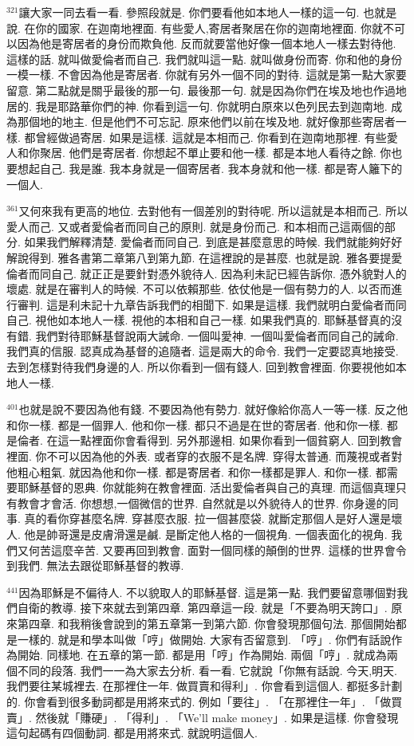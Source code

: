 \documentclass{book}
\begin{document}
$^{321}$讓大家一同去看一看.
參照段就是.
你們要看他如本地人一樣的這一句.
也就是說.
在你的國家.
在迦南地裡面.
有些愛人,寄居者聚居在你的迦南地裡面.
你就不可以因為他是寄居者的身份而欺負他.
反而就要當他好像一個本地人一樣去對待他.
這樣的話.
就叫做愛倫者而自己.
我們就叫這一點.
就叫做身份而寄.
你和他的身份一模一樣.
不會因為他是寄居者.
你就有另外一個不同的對待.
這就是第一點大家要留意.
第二點就是關乎最後的那一句.
最後那一句.
就是因為你們在埃及地也作過地居的.
我是耶路華你們的神.
你看到這一句.
你就明白原來以色列民去到迦南地.
成為那個地的地主.
但是他們不可忘記.
原來他們以前在埃及地.
就好像那些寄居者一樣.
都曾經做過寄居.
如果是這樣.
這就是本相而己.
你看到在迦南地那裡.
有些愛人和你聚居.
他們是寄居者.
你想起不單止要和他一樣.
都是本地人看待之餘.
你也要想起自己.
我是誰.
我本身就是一個寄居者.
我本身就和他一樣.
都是寄人籬下的一個人.

$^{361}$又何來我有更高的地位.
去對他有一個差別的對待呢.
所以這就是本相而己.
所以愛人而己.
又或者愛倫者而同自己的原則.
就是身份而己.
和本相而己這兩個的部分.
如果我們解釋清楚.
愛倫者而同自己.
到底是甚麼意思的時候.
我們就能夠好好解說得到.
雅各書第二章第八到第九節.
在這裡說的是甚麼.
也就是說.
雅各要提愛倫者而同自己.
就正正是要針對憑外貌待人.
因為利未記已經告訴你.
憑外貌對人的壞處.
就是在審判人的時候.
不可以依賴那些.
依仗他是一個有勢力的人.
以否而進行審判.
這是利未記十九章告訴我們的相聞下.
如果是這樣.
我們就明白愛倫者而同自己.
視他如本地人一樣.
視他的本相和自己一樣.
如果我們真的.
耶穌基督真的沒有錯.
我們對待耶穌基督說兩大誡命.
一個叫愛神.
一個叫愛倫者而同自己的誡命.
我們真的信服.
認真成為基督的追隨者.
這是兩大的命令.
我們一定要認真地接受.
去到怎樣對待我們身邊的人.
所以你看到一個有錢人.
回到教會裡面.
你要視他如本地人一樣.

$^{401}$也就是說不要因為他有錢.
不要因為他有勢力.
就好像給你高人一等一樣.
反之他和你一樣.
都是一個罪人.
他和你一樣.
都只不過是在世的寄居者.
他和你一樣.
都是倫者.
在這一點裡面你會看得到.
另外那邊相.
如果你看到一個貧窮人.
回到教會裡面.
你不可以因為他的外表.
或者穿的衣服不是名牌.
穿得太普通.
而蔑視或者對他粗心粗氣.
就因為他和你一樣.
都是寄居者.
和你一樣都是罪人.
和你一樣.
都需要耶穌基督的恩典.
你就能夠在教會裡面.
活出愛倫者與自己的真理.
而這個真理只有教會才會活.
你想想,一個微信的世界.
自然就是以外貌待人的世界.
你身邊的同事.
真的看你穿甚麼名牌.
穿甚麼衣服.
拉一個甚麼袋.
就斷定那個人是好人還是壞人.
他是帥哥還是皮膚滑還是鹹.
是斷定他人格的一個視角.
一個表面化的視角.
我們又何苦這麼辛苦.
又要再回到教會.
面對一個同樣的顛倒的世界.
這樣的世界會令到我們.
無法去跟從耶穌基督的教導.

$^{441}$因為耶穌是不偏待人.
不以貌取人的耶穌基督.
這是第一點.
我們要留意哪個對我們自衛的教導.
接下來就去到第四章.
第四章這一段.
就是「不要為明天誇口」.
原來第四章.
和我稍後會說到的第五章第一到第六節.
你會發現那個句法.
那個開始都是一樣的.
就是和學本叫做「哼」做開始.
大家有否留意到.
「哼」.
你們有話說作為開始.
同樣地.
在五章的第一節.
都是用「哼」作為開始.
兩個「哼」.
就成為兩個不同的段落.
我們一一為大家去分析.
看一看.
它就說「你無有話說.
今天,明天.
我們要往某城裡去.
在那裡住一年.
做買賣和得利」.
你會看到這個人.
都挺多計劃的.
你會看到很多動詞都是用將來式的.
例如「要往」.
「在那裡住一年」.
「做買賣」.
然後就「賺硬」.
「得利」.
「We'll make money」.
如果是這樣.
你會發現這句起碼有四個動詞.
都是用將來式.
就說明這個人.
\end{document}
